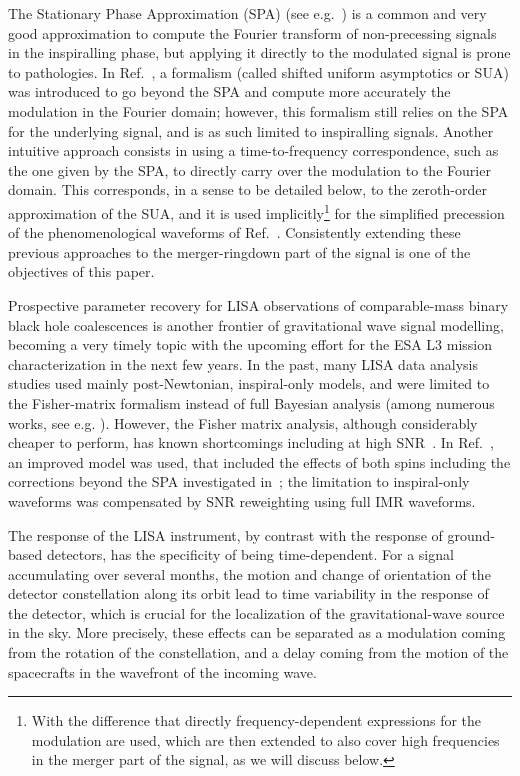 \documentclass[aps,showpacs,%
prd,superscriptaddress,nofootinbib]{revtex4}
\begin{document}
The Stationary Phase Approximation (SPA) (see e.g.~\cite{Thorne300, CF94}) is a common and very good approximation to compute the Fourier transform of non-precessing signals in the inspiralling phase, but applying it directly to the modulated signal is prone to pathologies. In Ref.~\cite{KCY13,KCY14}, a formalism (called shifted uniform asymptotics or SUA) was introduced to go beyond the SPA and compute more accurately the modulation in the Fourier domain; however, this formalism still relies on the SPA for the underlying signal, and is as such limited to inspiralling signals. Another intuitive approach consists in using a time-to-frequency correspondence, such as the one given by the SPA, to directly carry over the modulation to the Fourier domain. This corresponds, in a sense to be detailed below, to the zeroth-order approximation of the SUA, and it is used implicitly\footnote{With the difference that directly frequency-dependent expressions for the modulation are used, which are then extended to also cover high frequencies in the merger part of the signal, as we will discuss below.} for the simplified precession of the phenomenological waveforms of Ref.~\cite{Hannam+13}. Consistently extending these previous approaches to the merger-ringdown part of the signal is one of the objectives of this paper.

Prospective parameter recovery for LISA observations of comparable-mass binary black hole coalescences is another frontier of gravitational wave signal modelling, becoming a very timely topic with the upcoming effort for the ESA L3 mission characterization in the next few years. In the past, many LISA data analysis studies used mainly post-Newtonian, inspiral-only models, and were limited to the Fisher-matrix formalism instead of full Bayesian analysis (among numerous works, see e.g. \cite{Cutler97,LISAPE09}). However, the Fisher matrix analysis, although considerably cheaper to perform, has known shortcomings including at high SNR~\cite{Vallisneri08,Cokelaer08,Rodriguez+13}. In Ref.~\cite{Klein+15}, an improved model was used, that included the effects of both spins including the corrections beyond the SPA investigated in~\cite{KCY14}; the limitation to inspiral-only waveforms was compensated by SNR reweighting using full IMR waveforms.

The response of the LISA instrument, by contrast with the response of ground-based detectors, has the specificity of being time-dependent. For a signal accumulating over several months, the motion and change of orientation of the detector constellation along its orbit lead to time variability in the response of the detector, which is crucial for the localization of the gravitational-wave source in the sky. More precisely, these effects can be separated as a modulation coming from the rotation of the constellation, and a delay coming from the motion of the spacecrafts in the wavefront of the incoming wave.
\end{document}
